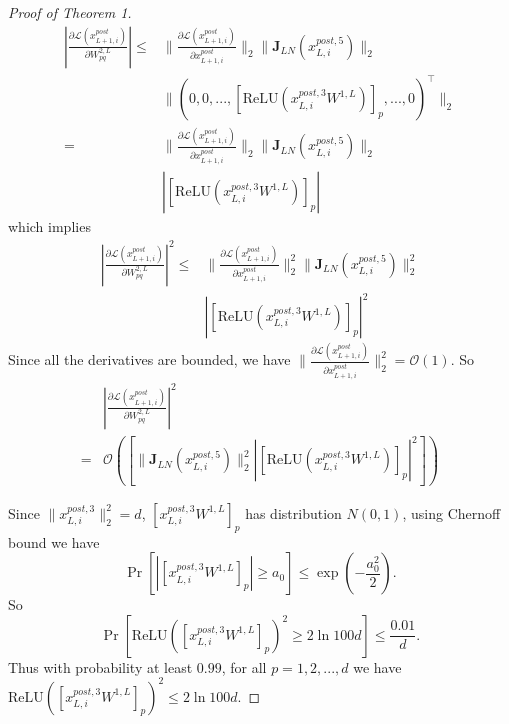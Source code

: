 \documentclass{article}
\begin{document}
\begin{proof}[Proof of Theorem 1]
\begin{align}
|\frac{\partial \mathcal{L}(x_{L+1,i}^{post})}{\partial W^{2,L}_{pq}}|\leq &\|\frac{\partial \mathcal{L}(x_{L+1,i}^{post})}{\partial x_{L+1,i}^{post}}\|_2\|\mathbf{J}_{LN}(x_{L,i}^{post,5})\|_2\nonumber\\
&\|(0,0,...,[\text{ReLU}(x_{L,i}^{post,3}W^{1,L})]_p,...,0)^{\top}\|_2\\
=&\|\frac{\partial \mathcal{L}(x_{L+1,i}^{post})}{\partial x_{L+1,i}^{post}}\|_2\|\mathbf{J}_{LN}(x_{L,i}^{post,5})\|_2\nonumber\\
&|[\text{ReLU}(x_{L,i}^{post,3}W^{1,L})]_p|
\end{align}
which implies
\begin{align}
|\frac{\partial \mathcal{L}(x_{L+1,i}^{post})}{\partial W^{2,L}_{pq}}|^2\leq& \|\frac{\partial \mathcal{L}(x_{L+1,i}^{post})}{\partial x_{L+1,i}^{post}}\|^2_2\|\mathbf{J}_{LN}(x_{L,i}^{post,5})\|^2_2\nonumber\\
&|[\text{ReLU}(x_{L,i}^{post,3}W^{1,L})]_p|^2
\end{align}
Since all the derivatives are bounded, we have $\|\frac{\partial \mathcal{L}(x_{L+1,i}^{post})}{\partial x_{L+1,i}^{post}}\|^2_2=\mathcal{O}(1)$. So 
\begin{align}
&|\frac{\partial \mathcal{L}(x_{L+1,i}^{post})}{\partial W^{2,L}_{pq}}|^2\nonumber\\
=&\mathcal{O}(\left[\|\mathbf{J}_{LN}(x_{L,i}^{post,5})\|^2_2|[\text{ReLU}(x_{L,i}^{post,3}W^{1,L})]_p|^2\right])
\end{align}

Since $\|x_{L,i}^{post,3}\|_2^2=d$, $[x_{L,i}^{post,3}W^{1,L}]_p$ has distribution $N(0,1)$, using Chernoff bound we have
$$\operatorname{Pr}[|[x_{L,i}^{post,3}W^{1,L}]_p|\geq a_0]\leq \operatorname{exp}(-\frac{a_0^2}{2}).$$
So $$\operatorname{Pr}[\text{ReLU}([x_{L,i}^{post,3}W^{1,L}]_p)^2\geq 2\ln{100d}]\leq \frac{0.01}{d}.$$
Thus with probability at least $0.99$, for all $p=1,2,...,d$ we have $\text{ReLU}([x_{L,i}^{post,3}W^{1,L}]_p)^2\leq 2\ln{100d}$.


\end{proof}
\end{document}
